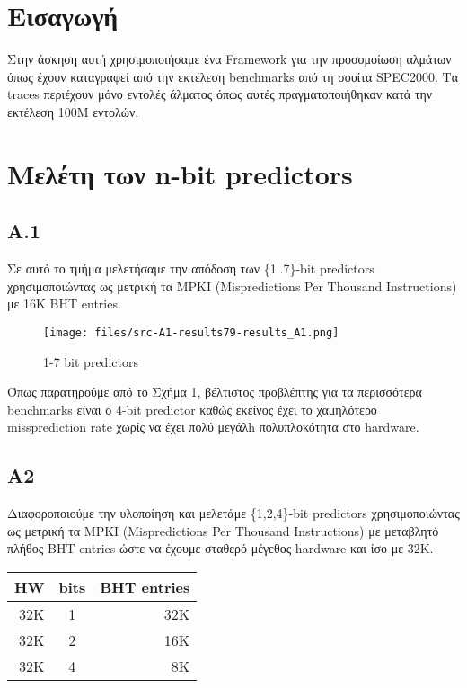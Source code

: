 \documentclass[a4paper,12pt]{article}
\begin{document}
\def\thesection {\roman{section}: }
\def\thesubsection {\Roman{subsection}) }



\section*{Εισαγωγή}

Στην άσκηση αυτή χρησιμοποιήσαμε ένα Framework για την προσομοίωση αλμάτων
όπως έχουν καταγραφεί από την εκτέλεση benchmarks από τη σουίτα SPEC2000. Τα
traces περιέχουν μόνο εντολές άλματος όπως αυτές πραγματοποιήθηκαν κατά την
εκτέλεση 100M εντολών.


\section*{Μελέτη των n-bit predictors}


\subsection*{A.1}
Σε αυτό το τμήμα μελετήσαμε την απόδοση των \{1..7\}-bit predictors χρησιμοποιώντας ως μετρική τα MPKI (Mispredictions Per
Thousand Instructions) με 16K BHT entries.


\begin{figure}[H]
	\centering
	\texttt{[image: files/src-A1-results79-results\_A1.png]}
	\caption{1-7 bit predictors}
	\label{fig:A1}
\end{figure}


Όπως παρατηρούμε από το Σχήμα \ref{fig:A1}, βέλτιστος προβλέπτης για τα
περισσότερα benchmarks είναι ο 4-bit predictor καθώς εκείνος έχει το
χαμηλότερο missprediction rate χωρίς να έχει πολύ μεγάλh πολυπλοκότητα στο
hardware.



\pagebreak


\subsection*{A2}
Διαφοροποιούμε την υλοποίηση και μελετάμε \{1,2,4\}-bit predictors χρησιμοποιώντας ως μετρική τα MPKI (Mispredictions Per
Thousand Instructions) με μεταβλητό πλήθος BHT entries ώστε να έχουμε σταθερό
μέγεθος hardware και ίσο με 32Κ.

\begin{tabular}{r c r}
	HW & bits & BHT entries \\
	\hline
	\hline
	32K & 1 & 32K	\\
	32K & 2 & 16K	\\
	32K & 4 & 8K	\\
\end{tabular}
\end{document}
